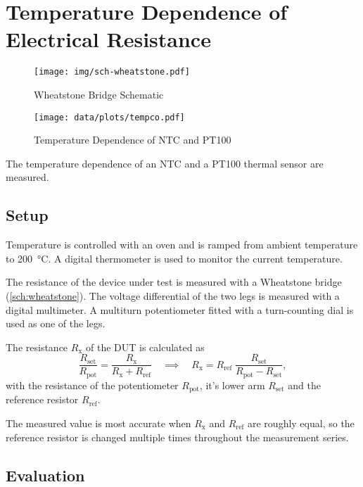 \chapter{Temperature Dependence of Electrical Resistance}

\begin{figure}
	\centering
	\texttt{[image: img/sch-wheatstone.pdf]}
	\caption{Wheatstone Bridge Schematic}
	\label{sch:wheatstone}
\end{figure}

\begin{figure}
	\centering
	\texttt{[image: data/plots/tempco.pdf]}
	\caption{Temperature Dependence of NTC and PT100}
	\label{plot:tempco}
\end{figure}

The temperature dependence of an NTC and a PT100 thermal sensor are measured.

\section{Setup}

Temperature is controlled with an oven and is ramped from ambient temperature to \SI{200}{\celsius}.
A digital thermometer is used to monitor the current temperature.

The resistance of the device under test is measured with a Wheatstone bridge (\autoref{sch:wheatstone}).
The voltage differential of the two legs is measured with a digital multimeter.
A multiturn potentiometer fitted with a turn-counting dial is used as one of the legs.

The resistance $R_\text{x}$ of the DUT is calculated as
\begin{equation}
	\frac{R_\text{set}}{R_\text{pot}} = \frac{R_\text{x}}{R_\text{x} + R_\text{ref}}
	\quad \implies \quad R_\text{x} = R_\text{ref} \; \frac{R_\text{set}}{R_\text{pot} - R_\text{set}},
\end{equation}
with the resistance of the potentiometer $R_\text{pot}$, it's lower arm $R_\text{set}$ and the reference resistor $R_\text{ref}$.

The measured value is most accurate when $R_\text{x}$ and $R_\text{ref}$ are roughly equal, so the reference resistor is changed multiple times throughout the measurement series.

\section{Evaluation}

